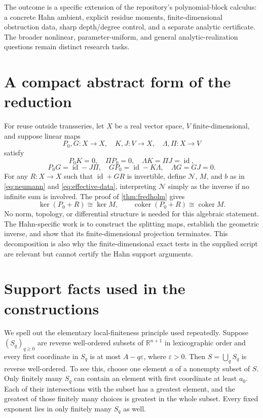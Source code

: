 \documentclass[11pt,a4paper]{article}
\numberwithin{equation}{section}
\theoremstyle{definition}
\theoremstyle{remark}
\newcommand{\R}{\mathbb R}
\newcommand{\coker}{\operatorname{coker}}
\newcommand{\id}{\operatorname{id}}
\newcommand{\eps}{\varepsilon}
\newcommand{\shift}{\mathcal N}
\begin{document}
The outcome is a specific extension of the repository's polynomial-block calculus: a concrete Hahn ambient, explicit residue moments, finite-dimensional obstruction data, sharp depth/degree control, and a separate analytic certificate. The broader nonlinear, parameter-uniform, and general analytic-realization questions remain distinct research tasks.

\appendix
\section{A compact abstract form of the reduction}
\label{app:abstract}
For reuse outside transseries, let $X$ be a real vector space, $V$ finite-dimensional, and suppose linear maps
\[
 P_0,G:X\to X,\quad K,J:V\to X,\quad\Lambda,\Pi:X\to V
\]
satisfy
\[
 P_0K=0,\quad\Pi P_0=0,\quad\Lambda K=\Pi J=\id,
\]
\[
 P_0G=\id-J\Pi,\quad GP_0=\id-K\Lambda,
 \quad\Lambda G=GJ=0.
\]
For any $R:X\to X$ such that $\id+GR$ is invertible, define $\shift$, $M$, and $b$ as in \eqref{eq:neumann} and \eqref{eq:effective-data}, interpreting $\shift$ simply as the inverse if no infinite sum is involved. The proof of \cref{thm:fredholm} gives
\[
 \ker(P_0+R)\cong\ker M,\qquad
 \coker(P_0+R)\cong\coker M.
\]
No norm, topology, or differential structure is needed for this algebraic statement. The Hahn-specific work is to construct the splitting maps, establish the geometric inverse, and show that its finite-dimensional projection terminates. This decomposition is also why the finite-dimensional exact tests in the supplied script are relevant but cannot certify the Hahn support arguments.

\section{Support facts used in the constructions}
\label{app:support}
We spell out the elementary local-finiteness principle used repeatedly. Suppose $(S_q)_{q\ge0}$ are reverse well-ordered subsets of $\R^{n+1}$ in lexicographic order and every first coordinate in $S_q$ is at most $A-q\eps$, where $\eps>0$. Then $S=\bigcup_qS_q$ is reverse well-ordered. To see this, choose one element $a$ of a nonempty subset of $S$. Only finitely many $S_q$ can contain an element with first coordinate at least $a_0$. Each of their intersections with the subset has a greatest element, and the greatest of those finitely many choices is greatest in the whole subset. Every fixed exponent lies in only finitely many $S_q$ as well.
\end{document}
